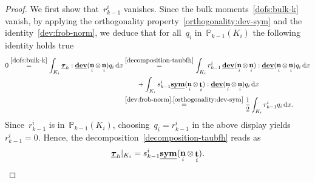 \documentclass[a4paper,twoside,10pt]{article}
\theoremstyle{plain}
\theoremstyle{remark}
\theoremstyle{definition}
\numberwithin{equation}{section}
\numberwithin{figure}{section}
\newcommand{\Pbbkmo}{\mathbb{P}_{k-1}}
\newcommand{\K}{K}
\newcommand{\taubfh}{\underline{\boldsymbol{\tau}}_h}
\DeclareMathOperator{\dev}{\underline{\mathbf{dev}}}
\newcommand{\sym}{\underline{\bf{sym}}}
\DeclareMathOperator{\norm}{\bf{n}}
\DeclareMathOperator{\tang}{\bf{t}}
\newcommand{\dx}{\, \mathrm{d}x}
\newcommand{\rkmoi}{r_{k-1}^i}
\newcommand{\skmoi}{s_{k-1}^i}
\newcommand{\Ki}{{\K_i}}
\newcommand{\normi}{\norm_i}
\newcommand{\tangi}{\tang_i}
\newcommand{\qi}{q_{i}}
\begin{document}
\begin{proof}
We first show that~$\rkmoi$ vanishes.
Since the bulk moments~\eqref{dofs:bulk-k} vanish,
by applying the orthogonality property~\eqref{orthogonality:dev-sym}
and the identity~\eqref{dev:frob-norm},
we deduce that
for all~$\qi$ in~$\Pbbkmo(\Ki)$
the following identity holds true
\begin{equation*} 
\begin{split}
0 
\overset{\eqref{dofs:bulk-k}}{=}
\int_\Ki  \taubfh : \dev(\normi\otimes\normi) \qi \dx
&\overset{\eqref{decomposition-taubfh}}{=}
\int_\Ki  \rkmoi \dev(\normi\otimes\normi) : \dev(\normi\otimes\normi) \qi \dx \\
&\qquad+ \int_\Ki \skmoi \sym(\normi\otimes\tangi) :  \dev(\normi\otimes\normi) \qi \dx \\
&\overset{\eqref{dev:frob-norm},\eqref{orthogonality:dev-sym}}{=}
\frac12 \int_\Ki  \rkmoi \qi \dx.
\end{split}
\end{equation*}
Since~$\rkmoi$ is in~$\Pbbkmo(\Ki)$,
choosing~$\qi = \rkmoi$ in
the above display yields~$\rkmoi = 0$.
Hence,
the decomposition~\eqref{decomposition-taubfh} reads as
\begin{equation} \label{decomposition-taubfh-rkmoizero}
\taubfh|_{\Ki} = \skmoi\sym(\normi\otimes\tangi).
\end{equation}


\end{proof}
\end{document}
